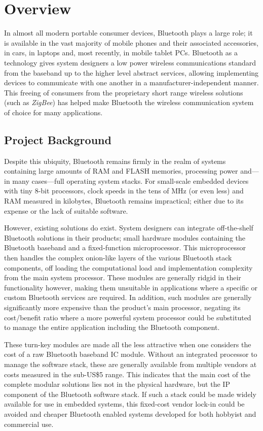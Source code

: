 \chapter{Overview}
\label{chp:overview}

In almost all modern portable consumer devices, Bluetooth plays a large role; it is available in the vast majority of mobile phones and their associated accessories, in cars, in laptops and, most recently, in mobile tablet PCs. Bluetooth as a technology gives system designers a low power wireless communications standard from the baseband up to the higher level abstract services, allowing implementing devices to communicate with one another in a manufacturer-independent manner. This freeing of consumers from the proprietary short range wireless solutions (such as \textit{ZigBee}) has helped make Bluetooth the wireless communication system of choice for many applications.

\section{Project Background}

Despite this ubiquity, Bluetooth remains firmly in the realm of systems containing large amounts of RAM and FLASH memories, processing power and---in many cases---full operating system stacks. For small-scale embedded devices with tiny 8-bit processors, clock speeds in the tens of MHz (or even less) and RAM measured in kilobytes, Bluetooth remains impractical; either due to its expense or the lack of suitable software.

However, existing solutions do exist. System designers can integrate off-the-shelf Bluetooth solutions in their products; small hardware modules containing the Bluetooth baseband and a fixed-function microprocessor. This microprocessor then handles the complex onion-like layers of the various Bluetooth stack components, off loading the computational load and implementation complexity from the main system processor. These modules are generally ridgid in their functionality however, making them unsuitable in applications where a specific or custom Bluetooth services are required. In addition, such modules are generally significantly more expensive than the product's main processor, negating its cost/benefit ratio where a more powerful system processor could be substituted to manage the entire application including the Bluetooth component.

These turn-key modules are made all the less attractive when one considers the cost of a raw Bluetooth baseband IC module. Without an integrated processor to manage the software stack, these are generally available from multiple vendors at costs measured in the sub-US\$5 range. This indicates that the main cost of the complete modular solutions lies not in the physical hardware, but the IP component of the Bluetooth software stack. If such a stack could be made widely available for use in embedded systems, this fixed-cost vendor lock-in could be avoided and cheaper Bluetooth enabled systems developed for both hobbyist and commercial use.

